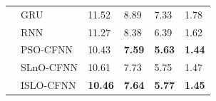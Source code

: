 \documentclass[a4paper,13pt,2p]{report}
\begin{document}
\begin{table}[!t]
\begin{tabular}{|l|l|l|l|l|l|}
                                     & GRU       & 11.52           & 8.89            & 7.33           & 1.78          \\ \cline{2-6} 
                                     & RNN       & 11.27           & 8.38            & 6.39           & 1.62          \\ \cline{2-6} 
                                     & PSO-CFNN  & 10.43           & \textbf{7.59}   & \textbf{5.63}  & \textbf{1.44} \\ \cline{2-6} 
                                     & SLnO-CFNN & 10.61           & 7.73            & 5.75           & 1.47          \\ \cline{2-6} 
                                     & ISLO-CFNN & \textbf{10.46}  & \textbf{7.64}   & \textbf{5.77}  & \textbf{1.45} \\ \hline
\end{tabular}
\end{table}
\end{document}
